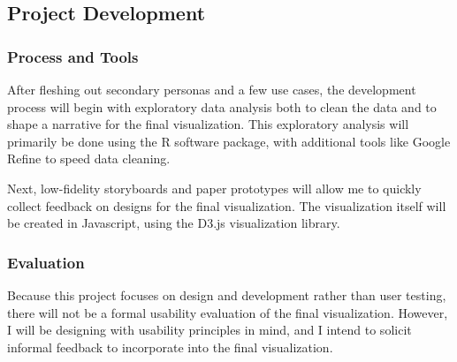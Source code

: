 \subsection{Project Development}
\subsubsection{Process and Tools}
After fleshing out secondary personas and a few use cases, the development process will begin with exploratory data analysis both to clean the data and to shape a narrative for the final visualization. This exploratory analysis will primarily be done using the R software package, with additional tools like Google Refine to speed data cleaning.

Next, low-fidelity storyboards and paper prototypes will allow me to quickly collect feedback on designs for the final visualization. The visualization itself will be created in Javascript, using the D3.js visualization library.

\subsubsection{Evaluation}
Because this project focuses on design and development rather than user testing, there will not be a formal usability evaluation of the final visualization. However, I will be designing with usability principles in mind, and I intend to solicit informal feedback to incorporate into the final visualization.
